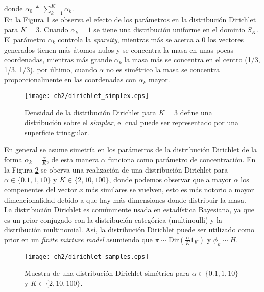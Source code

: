 donde $\alpha_{0} \triangleq \sum_{k=1}^{K}\alpha_{k}$.\\

En la Figura \ref{img:dirichlet_distribution} se observa el efecto de los parámetros en la distribución Dirichlet para $K=3$. Cuando $\alpha_{k}=1$ se tiene una distribución uniforme en el dominio $S_{K}$. El parámetro $\alpha_{k}$ controla la \textit{sparsity}, mientras más se acerca a 0 los vectores generados tienen más átomos nulos y se concentra la masa en unas pocas coordenadas, mientras más grande $\alpha_{k}$ la masa más se concentra en el centro (1/3, 1/3, 1/3), por último, cuando $\alpha$ no es simétrico la masa se concentra proporcionalmente en las coordenadas con $\alpha_{k}$ mayor.\\

\begin{figure}
    \centering
    \texttt{[image: ch2/dirichlet\_simplex.eps]}
    \caption{Densidad de la distribución Dirichlet para $K=3$ define una distribución sobre el \textit{simplex}, el cual puede ser representado por una superficie trinagular.}
    \label{img:dirichlet_distribution}
\end{figure}

En general se asume simetría en los parámetros de la distribución Dirichlet de la forma $\alpha_{k}=\frac{\alpha}{K}$, de esta manera $\alpha$ funciona como parámetro de concentración. En la Figura \ref{img:dirichlet_samples} se oberva una realización de una distribución Dirichlet para $\alpha \in \{0.1, 1, 10\}$ y $K\in\{2, 10, 100\}$, donde podemos observar que a mayor $\alpha$ los compenentes del vector $x$ más similares se vuelven, esto es más notorio a mayor dimencionalidad debido a que hay más dimensiones donde distribuir la masa.\\

La distribución Dirichlet es comúnmente usada en estadística Bayesiana, ya que es un prior conjugado con la distribución categórica (multinoulli) y la distribución multinomial. Así, la distribución Dirichlet puede ser utilizado como prior en un \textit{finite mixture model} asumiendo que $\pi\sim \text{Dir}(\frac{\alpha}{K}1_{K})$ y $\phi_{k} \sim H$.

\begin{figure}
    \centering
    \texttt{[image: ch2/dirichlet\_samples.eps]}
    \caption{Muestra de una distribución Dirichlet simétrica para $\alpha \in \{0.1, 1, 10\}$ y $K\in\{2, 10, 100\}$.}
    \label{img:dirichlet_samples}
\end{figure}

